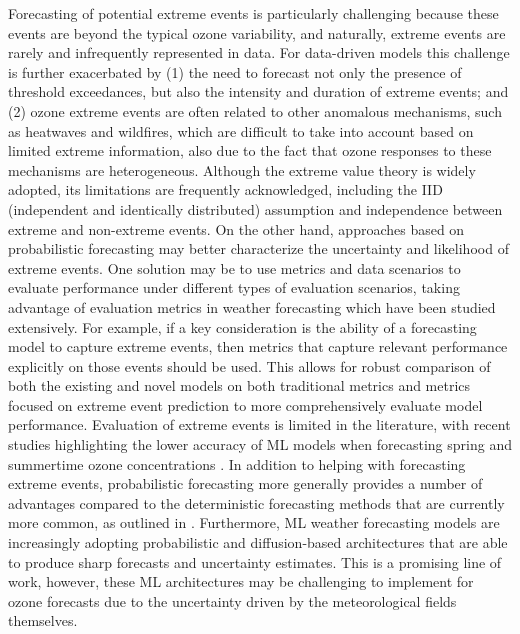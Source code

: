 \documentclass[gmd, manuscript]{copernicus}
\begin{document}
Forecasting of potential extreme events is particularly challenging because these events are beyond the typical ozone variability, and naturally, extreme events are rarely and infrequently represented in data. For data-driven models this challenge is further exacerbated by (1) the need to forecast not only the presence of threshold exceedances, but also the intensity and duration of extreme events; and (2) ozone extreme events are often related to other anomalous mechanisms, such as heatwaves and wildfires, which are difficult to take into account based on limited extreme information, also due to the fact that ozone responses to these mechanisms are heterogeneous. Although the extreme value theory is widely adopted, its limitations are frequently acknowledged, including the IID (independent and identically distributed) assumption and independence between extreme and non-extreme events. On the other hand, approaches based on probabilistic forecasting may better characterize the uncertainty and likelihood of extreme events. One solution may be to use metrics and data scenarios to evaluate performance under different types of evaluation scenarios, taking advantage of evaluation metrics in weather forecasting which have been studied extensively. For example, if a key consideration is the ability of a forecasting model to capture extreme events, then metrics that capture relevant performance explicitly on those events should be used. This allows for robust comparison of both the existing and novel models on both traditional metrics and metrics focused on extreme event prediction to more comprehensively evaluate model performance. Evaluation of extreme events is limited in the literature, with recent studies highlighting the lower accuracy of ML models when forecasting spring and summertime ozone concentrations \citep{leufen_o3resnet_2023, Hickman2023}. In addition to helping with forecasting extreme events, probabilistic forecasting more generally provides a number of advantages compared to the deterministic forecasting methods that are currently more common, as outlined in \citet{Bodnar2024}. Furthermore, ML weather forecasting models are increasingly adopting probabilistic and diffusion-based architectures that are able to produce sharp forecasts and uncertainty estimates. This is a promising line of work, however, these ML architectures may be challenging to implement for ozone forecasts due to the %
uncertainty driven by the meteorological fields themselves. 

\end{document}

